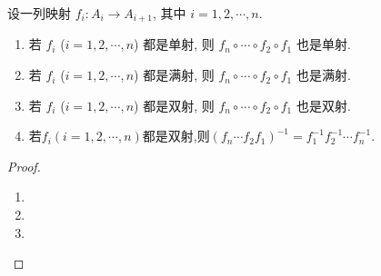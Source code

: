 \documentclass[../../main.tex]{subfiles}%
\begin{document}
\begin{proposition}\label{proposition:映射的复合保持单射、满射和双射}
设一列映射 $f_i:A_i\rightarrow A_{i + 1}$, 其中 $i = 1, 2, \cdots, n$.
\begin{enumerate}[(1)]
\item 若 $f_i$ ($i = 1, 2, \cdots, n$) 都是单射, 则 $f_n\circ \cdots \circ f_2\circ f_1$ 也是单射.

\item 若 $f_i$ ($i = 1, 2, \cdots, n$) 都是满射, 则 $f_n\circ \cdots \circ f_2\circ f_1$ 也是满射.

\item 若 $f_i$ ($i = 1, 2, \cdots, n$) 都是双射, 则 $f_n\circ \cdots \circ f_2\circ f_1$ 也是双射.

\item 若$f_i(i=1,2,\cdots,n)$都是双射,则$(f_n\cdots f_2f_1)^{-1}=f_1^{-1}f_2^{-1}\cdots f_n^{-1}$.
\end{enumerate} 
\end{proposition}
\begin{proof}
\begin{enumerate}[(1)]
\item 

\item 

\item 
\end{enumerate}
\end{proof}
\end{document}
